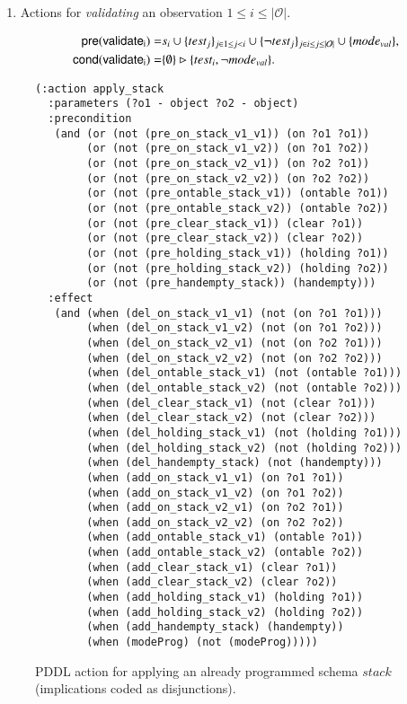 \documentclass[3p,times]{elsarticle}
\newcommand{\pre}{\mathsf{pre}}  %
\newcommand{\cond}{\mathsf{cond}}   %
\begin{document}
\begin{itemize}
\begin{enumerate}
\item Actions for {\em validating} an observation {\tt\small $1\leq i\leq |\mathcal{O}|$}.
\begin{small}
\begin{align*}
\hspace*{7pt}\pre(\mathsf{validate_{i}})=&s_i\cup\{test_j\}_{j\in 1\leq j<i}\cup\{\neg test_j\}_{j\in i\leq j\leq |\mathcal{O}|}\cup \{mode_{val}\},\\
\cond(\mathsf{validate_{i}})=&\{\emptyset\}\rhd\{test_i,\neg mode_{val}\}.
\end{align*}
\end{small}
\end{enumerate}
\end{itemize}

\begin{figure}
\begin{scriptsize}
\begin{verbatim}
(:action apply_stack
  :parameters (?o1 - object ?o2 - object)
  :precondition
   (and (or (not (pre_on_stack_v1_v1)) (on ?o1 ?o1))
        (or (not (pre_on_stack_v1_v2)) (on ?o1 ?o2))
        (or (not (pre_on_stack_v2_v1)) (on ?o2 ?o1))
        (or (not (pre_on_stack_v2_v2)) (on ?o2 ?o2))
        (or (not (pre_ontable_stack_v1)) (ontable ?o1))
        (or (not (pre_ontable_stack_v2)) (ontable ?o2))
        (or (not (pre_clear_stack_v1)) (clear ?o1))
        (or (not (pre_clear_stack_v2)) (clear ?o2))
        (or (not (pre_holding_stack_v1)) (holding ?o1))
        (or (not (pre_holding_stack_v2)) (holding ?o2))
        (or (not (pre_handempty_stack)) (handempty)))
  :effect
   (and (when (del_on_stack_v1_v1) (not (on ?o1 ?o1)))
        (when (del_on_stack_v1_v2) (not (on ?o1 ?o2)))
        (when (del_on_stack_v2_v1) (not (on ?o2 ?o1)))
        (when (del_on_stack_v2_v2) (not (on ?o2 ?o2)))
        (when (del_ontable_stack_v1) (not (ontable ?o1)))
        (when (del_ontable_stack_v2) (not (ontable ?o2)))
        (when (del_clear_stack_v1) (not (clear ?o1)))
        (when (del_clear_stack_v2) (not (clear ?o2)))
        (when (del_holding_stack_v1) (not (holding ?o1)))
        (when (del_holding_stack_v2) (not (holding ?o2)))
        (when (del_handempty_stack) (not (handempty)))
        (when (add_on_stack_v1_v1) (on ?o1 ?o1))
        (when (add_on_stack_v1_v2) (on ?o1 ?o2))
        (when (add_on_stack_v2_v1) (on ?o2 ?o1))
        (when (add_on_stack_v2_v2) (on ?o2 ?o2))
        (when (add_ontable_stack_v1) (ontable ?o1))
        (when (add_ontable_stack_v2) (ontable ?o2))
        (when (add_clear_stack_v1) (clear ?o1))
        (when (add_clear_stack_v2) (clear ?o2))
        (when (add_holding_stack_v1) (holding ?o1))
        (when (add_holding_stack_v2) (holding ?o2))
        (when (add_handempty_stack) (handempty))
        (when (modeProg) (not (modeProg)))))
\end{verbatim}
\end{scriptsize}
 \caption{\small PDDL action for applying an already programmed schema $stack$ (implications coded as disjunctions).}
\label{fig:compilation}
\end{figure}
\end{document}
